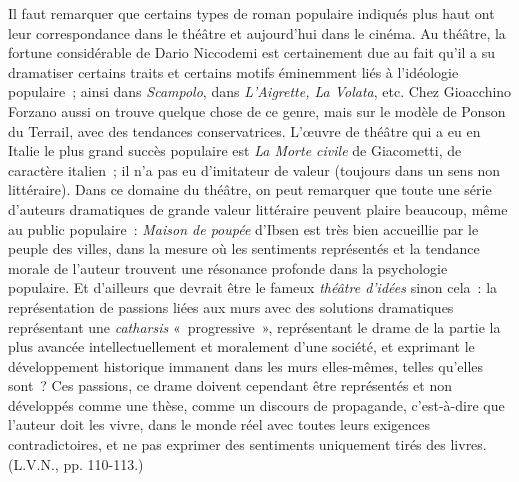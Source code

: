 \documentclass[french,twoside]{book} %
\begin{document}
Il faut remarquer que certains types de roman populaire indiqués plus haut ont leur correspondance dans le théâtre et aujourd’hui dans le cinéma. Au théâtre, la fortune considérable de Dario Niccodemi est certainement due au fait qu’il a su dramatiser certains traits et certains motifs éminemment liés à l’idéologie populaire ; ainsi dans \emph{Scampolo}, dans \emph{L'Aigrette, La Volata}, etc. Chez Gioacchino Forzano aussi on trouve quelque chose de ce genre, mais sur le modèle de Ponson du Terrail, avec des tendances conservatrices. L'œuvre de théâtre qui a eu en Italie le plus grand succès populaire est \emph{La Morte civile} de Giacometti, de caractère italien ; il n’a pas eu d’imitateur de valeur (toujours dans un sens non littéraire). Dans ce domaine du théâtre, on peut remarquer que toute une série d’auteurs dramatiques de grande valeur littéraire peuvent plaire beaucoup, même au public populaire : \emph{Maison de poupée} d’Ibsen est très bien accueillie par le peuple des villes, dans la mesure où les sentiments représentés et la tendance morale de l’auteur trouvent une résonance profonde dans la psychologie populaire. Et d’ailleurs que devrait être le fameux \emph{théâtre d’idées} sinon cela : la représentation de passions liées aux murs avec des solutions dramatiques représentant une \emph{catharsis} « progressive », représentant le drame de la partie la plus avancée intellectuellement et moralement d’une société, et exprimant le développement historique immanent dans les murs elles-mêmes, telles qu’elles sont ? Ces passions, ce drame doivent cependant être représentés et non développés comme une thèse, comme un discours de propagande, c’est-à-dire que l’auteur doit les vivre, dans le monde réel avec toutes leurs exigences contradictoires, et ne pas exprimer des sentiments uniquement tirés des livres. (L.V.N., pp. 110-113.)\par
{\raggedleft \noindent [1934-1935]}
\end{document}
